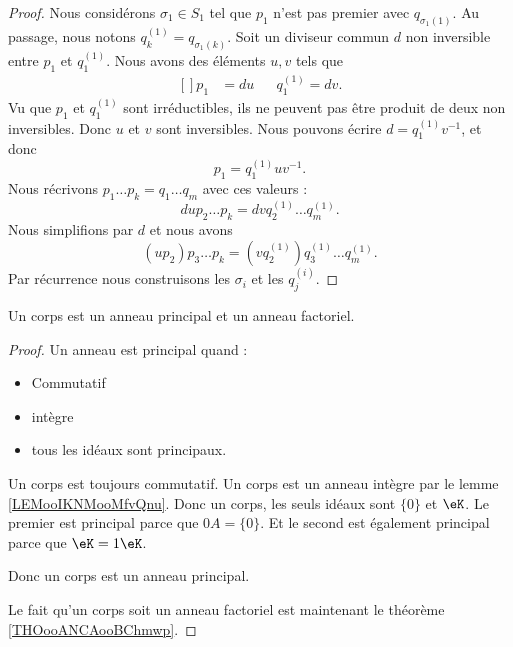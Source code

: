 \begin{proof}
	Nous considérons \( \sigma_1\in S_1\) tel que \( p_1\) n'est pas premier avec \( q_{\sigma_1(1)}\). Au passage, nous notons \( q^{(1)}_k=q_{\sigma_1(k)}\). Soit un diviseur commun \( d\) non inversible entre \( p_1\) et \( q^{(1)}_1\). Nous avons des éléments \( u,v\) tels que
	\begin{equation}
		\begin{aligned}[]
			p_1 & =du &  & q_1^{(1)}=dv.
		\end{aligned}
	\end{equation}
	Vu que \( p_1\) et \( q_1^{(1)}\) sont irréductibles, ils ne peuvent pas être produit de deux non inversibles. Donc \( u\) et \( v\) sont inversibles. Nous pouvons écrire \( d=q_1^{(1)}v^{-1}\), et donc
	\begin{equation}
		p_1=q_1^{(1)}uv^{-1}.
	\end{equation}
	Nous récrivons \( p_1\ldots p_k=q_1\ldots q_m\) avec ces valeurs :
	\begin{equation}
		dup_2\ldots p_k=dvq^{(1)}_2\ldots q_m^{(1)}.
	\end{equation}
	Nous simplifions par \( d\) et nous avons
	\begin{equation}
		(up_2)p_3\ldots p_k=(vq^{(1)}_2)q^{(1)}_3\ldots q_m^{(1)}.
	\end{equation}
	Par récurrence nous construisons les \( \sigma_i\) et les  \( q^{(i)}_j\).
\end{proof}

\begin{proposition}		\label{PROPooPVFOooJvWRIh}
	Un corps est un anneau principal et un anneau factoriel.
\end{proposition}

\begin{proof}
	Un anneau est principal quand :
	\begin{itemize}
		\item
		      Commutatif
		\item
		      intègre
		\item
		      tous les idéaux sont principaux.
	\end{itemize}
	Un corps est toujours commutatif. Un corps est un anneau intègre par le lemme \ref{LEMooIKNMooMfvQnu}. Donc un corps, les seuls idéaux sont \( \{ 0 \} \) et \( \eK\). Le premier est principal parce que \( 0A=\{ 0 \}\). Et le second est également principal parce que \( \eK=1\eK\).

	Donc un corps est un anneau principal.

	Le fait qu'un corps soit un anneau factoriel est maintenant le théorème \ref{THOooANCAooBChmwp}.
\end{proof}

